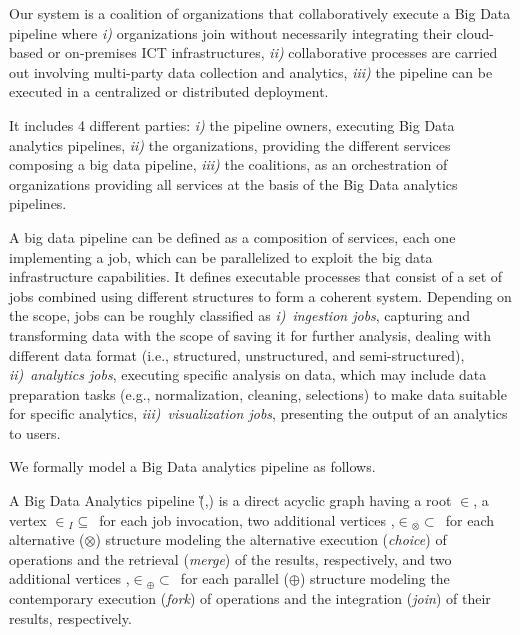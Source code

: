 Our system is a coalition of organizations that collaboratively execute a Big Data pipeline where
\emph{i)} organizations join without necessarily integrating their cloud-based or on-premises ICT infrastructures,
\emph{ii)} collaborative processes are carried out involving multi-party data collection and analytics,
\emph{iii)} the pipeline can be executed in a centralized or distributed deployment.

It includes 4 different parties:
\emph{i)} the pipeline owners, executing Big Data analytics pipelines,
\emph{ii)} the organizations, providing the different services composing a big data pipeline,
\emph{iii)} the coalitions, as an orchestration of organizations providing all services at the basis of the Big Data analytics pipelines.

A big data pipeline can be defined as a composition of services, each one implementing a job, which can be parallelized to exploit the big data infrastructure capabilities.
It defines executable processes that consist of a set of jobs combined using different structures to form a coherent system.
Depending on the scope, jobs can be roughly classified as
  {\em i)}~\emph{ingestion jobs}, capturing and transforming data with the scope of saving it for further analysis, dealing with different data format (i.e., structured, unstructured, and semi-structured),
{\em ii)}~\emph{analytics jobs}, executing specific analysis on data, which may include data preparation tasks (e.g., normalization, cleaning, selections) to make data suitable for specific analytics,
{\em iii)~visualization jobs}, presenting the output of an analytics to users.

We formally model a Big Data analytics pipeline as follows.

\begin{definition} \label{def:pipeline}
  A Big Data Analytics pipeline \G(\V,\E) is a direct acyclic graph having a root $\in$\V, a vertex $\in$\V$_I$$\subseteq$\V\ for each job  invocation, two additional vertices ,$\in$\V$_{\otimes}$$\subset$\V\ for each alternative ($\otimes$) structure modeling the alternative execution (\emph{choice}) of operations and the retrieval (\emph{merge}) of the results, respectively, and two additional vertices ,$\in$\V$_{\oplus}$$\subset$\V\ for each parallel ($\oplus$) structure modeling the contemporary execution (\emph{fork}) of operations and the integration (\emph{join}) of their results, respectively.
\end{definition}

